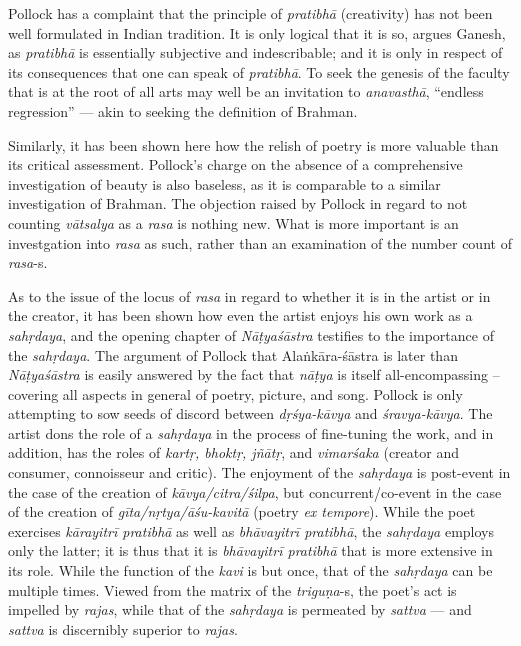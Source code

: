 Pollock has a complaint that the principle of \textsl{pratibhā} (creativity) has not been well formulated in Indian tradition. It is only logical that it is so, argues Ganesh, as \textsl{pratibhā} is essentially subjective and indescribable; and it is only in respect of its consequences that one can speak of \textsl{pratibhā}. To seek the genesis of the faculty that is at the root of all arts may well be an invitation to \textsl{anavasthā}, “endless regression” --- akin to seeking the definition of Brahman. 

Similarly, it has been shown here how the relish of poetry is more valuable than its critical assessment. Pollock’s charge on the absence of a comprehensive investigation of beauty is also baseless, as it is comparable to a similar investigation of Brahman. The objection raised by Pollock in regard to not counting \textsl{vātsalya} as a \textsl{rasa} is nothing new. What is more important is an investgation into \textsl{rasa} as such, rather than an examination of the number count of \textsl{rasa}-s.

As to the issue of the locus of \textsl{rasa} in regard to whether it is in the artist or in the creator, it has been shown how even the artist enjoys his own work as a \textsl{sahṛdaya}, and the opening chapter of \textsl{Nāṭyaśāstra} testifies to the importance of the \textsl{sahṛdaya}. The argument of Pollock that Alaṅkāra-śāstra is later than \textsl{Nāṭyaśāstra} is easily answered by the fact that \textsl{nāṭya} is itself all-encompassing -- covering all aspects in general of poetry, picture, and song. Pollock is only attempting to sow seeds of discord between \textsl{dṛśya-kāvya} and \textsl{śravya-kāvya}. The artist dons the role of a \textsl{sahṛdaya} in the process of fine-tuning the work, and in addition, has the roles of \textsl{kartṛ, bhoktṛ, jñātṛ}, and \textsl{vimarśaka} (creator and consumer, connoisseur and critic). The enjoyment of the \textsl{sahṛdaya} is post-event in the case of the creation of \textsl{kāvya/citra/śilpa}, but concurrent/co-event in the case of the creation of \textsl{gīta/nṛtya/āśu-kavitā} (poetry \textsl{ex tempore}). While the poet exercises \textsl{kārayitrī pratibhā} as well as \textsl{bhāvayitrī pratibhā}, the \textsl{sahṛdaya} employs only the latter; it is thus that it is \textsl{bhāvayitrī pratibhā} that is more extensive in its role. While the function of the \textsl{kavi} is but once, that of the \textsl{sahṛdaya} can be multiple times. Viewed from the matrix of the \textsl{triguṇa}-s, the poet's act is impelled by \textsl{rajas}, while that of the \textsl{sahṛdaya} is permeated by \textsl{sattva} --- and \textsl{sattva} is discernibly superior to \textsl{rajas}.

